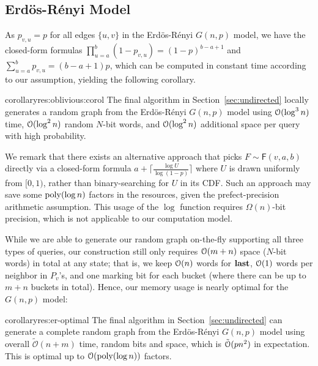\subsection{Erd\"{o}s-R\'{e}nyi Model}
\label{sec:app_er}
As $p_{v,u} = p$ for all edges $\{u,v\}$ in the Erd\"{o}s-R\'{e}nyi $G(n,p)$ model, we have the closed-form formulas $\prod_{u=a}^b (1-p_{v,u}) = (1-p)^{b-a+1}$ and $\sum_{u=a}^b p_{v,u} = (b-a+1)p$, which can be computed in constant time according to our assumption, yielding the following corollary.
\begin{restatable}{corollary}{res:oblivious:corol}
The final algorithm in Section~\ref{sec:undirected} locally generates a random graph from the Erd\"{o}s-R\'{e}nyi $G(n,p)$ model using $\mathcal{O}(\log^3 n)$ time, $\mathcal{O}(\log^2 n)$ random $N$-bit words, and $\mathcal{O}(\log^2 n)$ additional space per query with high probability.
\end{restatable}

We remark that there exists an alternative approach that picks $F\sim\mathsf{F}(v,a,b)$ directly via a closed-form formula $a+\lceil\frac{\log U}{\log (1-p)}\rceil$ where $U$ is drawn uniformly from $[0,1)$, rather than binary-searching for $U$ in its CDF. Such an approach may save some $\mathrm{poly}(\log n)$ factors in the resources, given the prefect-precision arithmetic assumption. This usage of the $\log$ function requires $\Omega(n)$-bit precision, which is not applicable to our computation model.

While we are able to generate our random graph on-the-fly supporting all three types of queries, our construction still only requires $\mathcal{O}(m+n)$ space ($N$-bit words) in total at any state; that is, we keep $\mathcal{O}(n)$ words for $\mathbf{last}$, $\mathcal{O}(1)$ words per neighbor in $P_v$'s, and one marking bit for each bucket (where there can be up to $m+n$ buckets in total). Hence, our memory usage is nearly optimal for the $G(n,p)$ model:

\begin{restatable}{corollary}{res:er-optimal}
\label{thm:er-optimal}
The final algorithm in Section~\ref{sec:undirected} can generate a complete random graph
from the Erd\"{o}s-R\'{e}nyi $G(n,p)$ model using overall
$\tilde{\mathcal{O}}(n+m)$ time, random bits and space, which is $\tilde{\mathcal{O}}(pn^2)$ in expectation.
This is optimal up to $ \mathcal{O}(\mathrm{poly}(\log n))$ factors.
\end{restatable}

\iffalse
The deterministic version (Section~\ref{sec:ER-det}) does not require the extra overhead resulting from failed iterations.
However, the two level data-structure introduces an extra $\Bo(\log n)$ factor, resulting in the same overall running time.
However, this only requires one $N$-bit random word.
\fi





